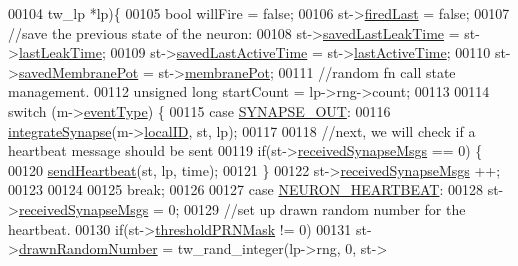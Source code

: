\begin{DoxyCode}
00104 tw\_lp *lp)\{
00105     \textcolor{keywordtype}{bool} willFire = \textcolor{keyword}{false};
00106     st->\hyperlink{structneuron_state_a287eb8703dbfb177165d31c8840646b8}{firedLast} = \textcolor{keyword}{false};
00107         \textcolor{comment}{//save the previous state of the neuron:}
00108     st->\hyperlink{structneuron_state_a50734a9ba605a083a90814b63d039a03}{savedLastLeakTime} = st->\hyperlink{structneuron_state_a6f4e4d8fc1cf0257b486e01f628d2656}{lastLeakTime};
00109     st->\hyperlink{structneuron_state_a6922b3f3041346eb83cfc6352a22277b}{savedLastActiveTime} = st->\hyperlink{structneuron_state_a0658ad1f8b57a00589c6ea84f9a4ab13}{lastActiveTime};
00110     st->\hyperlink{structneuron_state_a5efe5de0478ea513ed5d90d89a49fcca}{savedMembranePot} = st->\hyperlink{structneuron_state_a0fdd8f44c4105a94e17c4c58a51db486}{membranePot};
00111         \textcolor{comment}{//random fn call state management.}
00112     \textcolor{keywordtype}{unsigned} \textcolor{keywordtype}{long} startCount = lp->rng->count;
00113 
00114     \textcolor{keywordflow}{switch} (m->\hyperlink{struct_msg___data_a015b6eb45982e1842ee8fc389a099ced}{eventType}) \{
00115   \textcolor{keywordflow}{case} \hyperlink{assist_8h_a7c1688de451e0dea1e11617bce3ec450a6ad6b93d8a818550e7246f6e0d143afb}{SYNAPSE\_OUT}:
00116             \hyperlink{neuron_8c_ae630bdf5dd3744870968f07a6971659c}{integrateSynapse}(m->\hyperlink{struct_msg___data_aefc820e92a74047ec7ed74c1c45f818f}{localID}, st, lp);
00117 
00118                 \textcolor{comment}{//next, we will check if a heartbeat message should be sent}
00119             \textcolor{keywordflow}{if}(st->\hyperlink{structneuron_state_af8935bcba177f2f3dfb9119c39ef7dc5}{receivedSynapseMsgs} == 0) \{
00120                 \hyperlink{neuron_8c_a766dff9e530486b055e97ebe392268b8}{sendHeartbeat}(st, lp, time);
00121             \}
00122             st->\hyperlink{structneuron_state_af8935bcba177f2f3dfb9119c39ef7dc5}{receivedSynapseMsgs} ++;
00123 
00124 
00125             \textcolor{keywordflow}{break};
00126 
00127         \textcolor{keywordflow}{case} \hyperlink{assist_8h_a7c1688de451e0dea1e11617bce3ec450a226690009a653238a52339561e6c466e}{NEURON\_HEARTBEAT}:
00128             st->\hyperlink{structneuron_state_af8935bcba177f2f3dfb9119c39ef7dc5}{receivedSynapseMsgs} = 0;
00129                 \textcolor{comment}{//set up drawn random number for the heartbeat.}
00130             \textcolor{keywordflow}{if}(st->\hyperlink{structneuron_state_aa501d6ee7cacd5435deec79c07637b08}{thresholdPRNMask} != 0)
00131                 st->\hyperlink{structneuron_state_a296a4f04813c4882d6acd8c9074abd35}{drawnRandomNumber} = tw\_rand\_integer(lp->rng, 0, st->

\end{DoxyCode}
